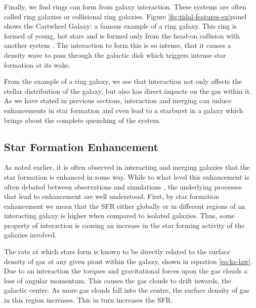 Finally, we find rings can form from galaxy interaction. These systems are often called ring galaxies or collisional ring galaxies. Figure \ref{fig:tidal-features-ex}\DIFdelbegin {}\DIFdelend \DIFaddbegin {}\DIFaddend panel shows the Cartwheel Galaxy: a famous example of a ring galaxy. This ring is formed of young, hot stars and is formed only from the head-on collision with another system \citep{1976ApJ...209..382L}. The interaction to form this is so intense, that it causes a density wave to pass through the galactic disk which triggers intense star formation at its wake.

From the example of a ring galaxy, we see that interaction not only affects the stellar distribution of the galaxy, but also has direct impacts on the gas within it. As we have stated in previous sections, interaction and merging can induce enhancements in star formation and even lead to a starburst in a galaxy which brings about the complete quenching of the system.

\subsection{Star Formation Enhancement} 
\noindent As noted earlier, it is often observed in interacting and merging galaxies that the star formation is enhanced in some way. While to what level this enhancement is often debated between observations \citep{2003ApJ...582..668B, 2008MNRAS.385.1903L, 2011MNRAS.412..591P, 2022ApJS..261...34H} and simulations \citep{2007A&A...468...61D, 2008MNRAS.384..386C, 2013MNRAS.430.1901H, 2021MNRAS.503.3113M}, the underlying processes that lead to enhancement are well understood. First, by star formation enhancement we mean that the SFR either globally or in different regions of an interacting galaxy is higher when compared to isolated galaxies. Thus, some property of interaction is causing an increase in the star forming activity of the galaxies involved. 

The rate at which stars form is known to be directly related to the surface density of gas at any given piont within the galaxy, shown in equation \ref{eq:ks-law}. Due to an interaction the torques and gravitational forces upon the gas clouds \DIFaddbegin {}\DIFaddend a loss of angular momentum. This causes the gas clouds to drift inwards, \DIFdelbegin {}\DIFdelend \DIFaddbegin {}\DIFaddend the galactic centre. As more gas clouds fall into the centre, the surface density of gas in this region increases. This in turn increases the SFR.

